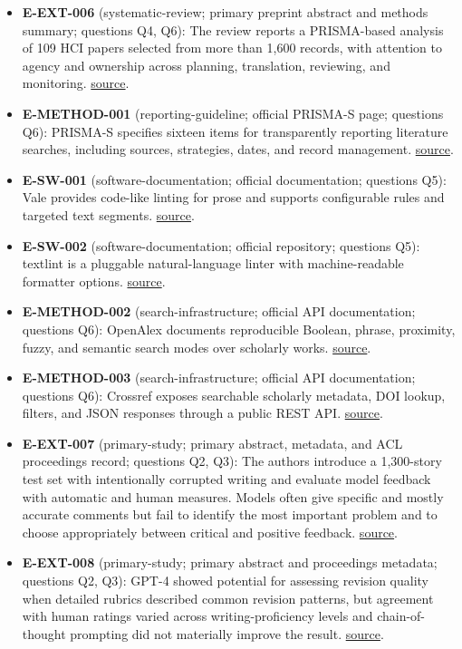 \documentclass[11pt]{article}
\begin{document}
\begin{itemize}
\item
  \textbf{E-EXT-006} (systematic-review; primary preprint abstract and methods summary; questions Q4, Q6): The review reports a PRISMA-based analysis of 109 HCI papers selected from more than 1,600 records, with attention to agency and ownership across planning, translation, reviewing, and monitoring. \href{https://arxiv.org/abs/2504.12488}{source}.
\item
  \textbf{E-METHOD-001} (reporting-guideline; official PRISMA-S page; questions Q6): PRISMA-S specifies sixteen items for transparently reporting literature searches, including sources, strategies, dates, and record management. \href{https://www.prisma-statement.org/prisma-search}{source}.
\item
  \textbf{E-SW-001} (software-documentation; official documentation; questions Q5): Vale provides code-like linting for prose and supports configurable rules and targeted text segments. \href{https://docs.vale.sh/}{source}.
\item
  \textbf{E-SW-002} (software-documentation; official repository; questions Q5): textlint is a pluggable natural-language linter with machine-readable formatter options. \href{https://github.com/textlint/textlint}{source}.
\item
  \textbf{E-METHOD-002} (search-infrastructure; official API documentation; questions Q6): OpenAlex documents reproducible Boolean, phrase, proximity, fuzzy, and semantic search modes over scholarly works. \href{https://help.openalex.org/api/searching/}{source}.
\item
  \textbf{E-METHOD-003} (search-infrastructure; official API documentation; questions Q6): Crossref exposes searchable scholarly metadata, DOI lookup, filters, and JSON responses through a public REST API. \href{https://www.crossref.org/documentation/retrieve-metadata/rest-api/}{source}.
\item
  \textbf{E-EXT-007} (primary-study; primary abstract, metadata, and ACL proceedings record; questions Q2, Q3): The authors introduce a 1,300-story test set with intentionally corrupted writing and evaluate model feedback with automatic and human measures. Models often give specific and mostly accurate comments but fail to identify the most important problem and to choose appropriately between critical and positive feedback. \href{https://aclanthology.org/2025.acl-long.1254/}{source}.
\item
  \textbf{E-EXT-008} (primary-study; primary abstract and proceedings metadata; questions Q2, Q3): GPT-4 showed potential for assessing revision quality when detailed rubrics described common revision patterns, but agreement with human ratings varied across writing-proficiency levels and chain-of-thought prompting did not materially improve the result. \href{https://aclanthology.org/2024.bea-1.30/}{source}.

\end{itemize}
\end{document}
